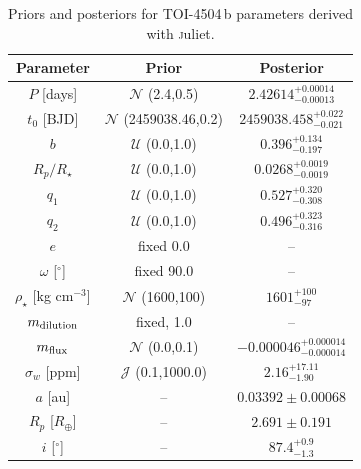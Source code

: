 \documentclass[twocolumn,twocolappendix]{aastex631}
\begin{document}
\begin{table}[ht!]
\caption{Priors and posteriors for TOI-4504\,b parameters derived with {\textsc juliet}.}
\centering
\label{02_transit_fit}
\begin{tabular}{ccc}
 \hline 
  \hline
Parameter       & Prior                         & Posterior                           \\ \hline
$P$ [days]               & $\mathcal{N}$ (2.4,0.5)       & $2.42614^{+0.00014}_{-0.00013}$           \\
$t_0$ [BJD]               & $\mathcal{N}$ (2459038.46,0.2)       & $2459038.458^{+0.022}_{-0.021}$           \\

$b$               & $\mathcal{U}$ (0.0,1.0)       & $0.396^{+0.134}_{-0.197}$           \\
$R_p/R_{\star}$               & $\mathcal{U}$ (0.0,1.0)       & $0.0268^{+0.0019}_{-0.0019}$           \\
$q_1$        & $\mathcal{U}$ (0.0,1.0)       & $0.527^{+0.320}_{-0.308}$           \\
$q_2$        & $\mathcal{U}$ (0.0,1.0)       & $0.496^{+0.323}_{-0.316}$           \\
$e$               & fixed 0.0                     & --                                  \\
$\omega$ [$^\circ$]           & fixed 90.0                    & --                                  \\
$\rho_{\star}$ [kg cm$^{-3}$]             & $\mathcal{N}$ (1600,100)      & $1601^{+100}_{-97}$                \\
$m_{\rm dilution}$ & fixed, 1.0                    & --                                  \\
$m_{\rm flux}$     & $\mathcal{N}$ (0.0,0.1)       & $-0.000046^{+0.000014}_{-0.000014}$ \\
$\sigma_w$ [ppm]  & $\mathcal{J}$ (0.1,1000.0)    & $2.16^{+17.11}_{-1.90}$                   \\
$a$ [au]               & --                            & $0.03392 \pm 0.00068$                  \\
$R_p$ [$R_{\oplus}$]   & --                            & $2.691 \pm 0.191$                  \\
$i$ [$^\circ$]   & --                            & $87.4^{+0.9}_{-1.3}$                  \\
\hline
\hline
\end{tabular}
\end{table}
\end{document}
